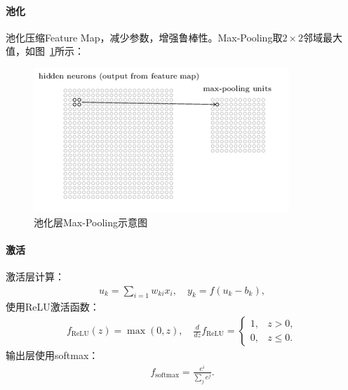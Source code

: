 \documentclass{whutmod}
\begin{document}
                \paragraph{池化}
                    池化压缩Feature Map，减少参数，增强鲁棒性。Max-Pooling取$2 \times 2$邻域最大值，如图~\ref{pool}所示：

                    \begin{figure}[H]
                        \centering
                        \includegraphics[width=.45\textwidth]{figures/pool.png}
                        \caption{池化层Max-Pooling示意图}\label{pool}
                    \end{figure}

                \paragraph{激活}
                    激活层计算：
                    \begin{gather*}
                        u_k = \sum_{i=1} w_{ki} x_i, \quad y_k = f(u_k - b_k),
                    \end{gather*}
                    使用ReLU激活函数：
                    \begin{gather}
                        f_{\text{ReLU}}(z) = \max(0,z), \quad \frac{d}{dz} f_{\text{ReLU}} = \begin{cases}
                            1, & z > 0, \\
                            0, & z \leqslant 0.
                        \end{cases}
                    \end{gather}
                    输出层使用softmax：
                    \begin{gather}
                        f_{\text{softmax}} = \frac{e^i}{\sum_j e^j}.
                    \end{gather}
\end{document}
